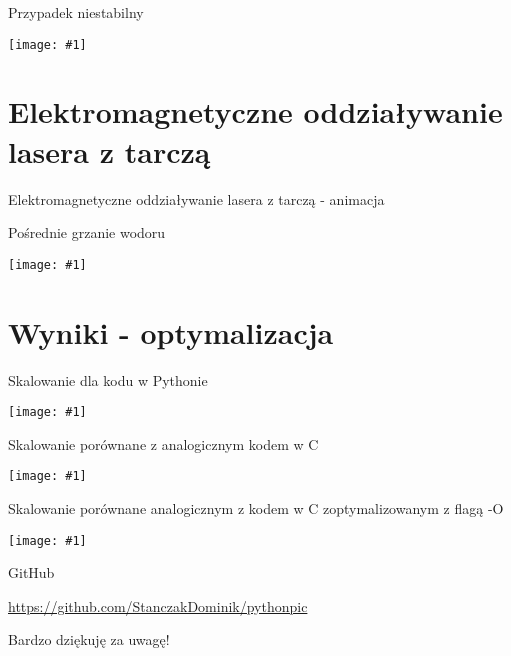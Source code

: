 \documentclass{beamer}
\newcommand {\graphic}[1] {
        \begin{center}
            \texttt{[image: \#1]}
        \end{center}
}
\begin{document}
        \begin{frame}[t]{Przypadek niestabilny}
          \graphic{img/TS_UNSTABLE_LARGE_DETAILS.pdf}
        \end{frame}

        \section{Elektromagnetyczne oddziaływanie lasera z tarczą}
        \begin{frame}[t]{Elektromagnetyczne oddziaływanie lasera z tarczą - animacja}
        \end{frame}
        \begin{frame}[t]{Pośrednie grzanie wodoru}
          \graphic{img/FULLLASER_DETAILS.pdf}
        \end{frame}

    \section{Wyniki - optymalizacja}
        \begin{frame}[t]{Skalowanie dla kodu w Pythonie}
          \graphic{img/speed_Python}
        \end{frame}

        \begin{frame}[t]{Skalowanie porównane z analogicznym kodem w C}
          \graphic{img/speed_Python_C}
        \end{frame}

        \begin{frame}[t]{Skalowanie porównane analogicznym z kodem w C zoptymalizowanym z flagą -O}
          \graphic{img/speed_Python_C_C-O}
        \end{frame}
        \begin{frame}[t]{GitHub}
          \begin{center}
          \large \url{https://github.com/StanczakDominik/pythonpic}
        \end{center}
        \end{frame}
    \begin{frame}[plain, c]
      \begin{center}
        \huge Bardzo dziękuję za uwagę!
      \end{center}
    \end{frame}
\end{document}
